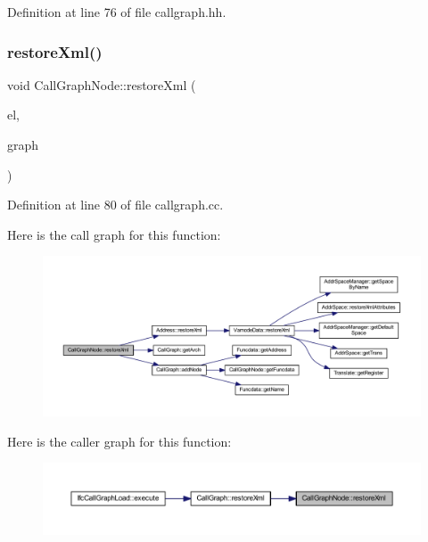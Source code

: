 Definition at line 76 of file callgraph.\+hh.

\mbox{\label{class_call_graph_node_a0b6c6ec59775a76b838b3d12c3a454f1}} 
\subsubsection{\texorpdfstring{restoreXml()}{restoreXml()}}
{\footnotesize\ttfamily void Call\+Graph\+Node\+::restore\+Xml (\begin{DoxyParamCaption}\item[{const \mbox{\hyperlink{class_element}{Element}} $\ast$}]{el,  }\item[{\mbox{\hyperlink{class_call_graph}{Call\+Graph}} $\ast$}]{graph }\end{DoxyParamCaption})\hspace{0.3cm}{\ttfamily [static]}}



Definition at line 80 of file callgraph.\+cc.

Here is the call graph for this function\+:
\nopagebreak
\begin{figure}[H]
\begin{center}
\leavevmode
\includegraphics[width=350pt]{class_call_graph_node_a0b6c6ec59775a76b838b3d12c3a454f1_cgraph}
\end{center}
\end{figure}
Here is the caller graph for this function\+:
\nopagebreak
\begin{figure}[H]
\begin{center}
\leavevmode
\includegraphics[width=350pt]{class_call_graph_node_a0b6c6ec59775a76b838b3d12c3a454f1_icgraph}
\end{center}
\end{figure}
\mbox{\label{class_call_graph_node_a0379699be791f33d9b411adb19bec7a5}} 
